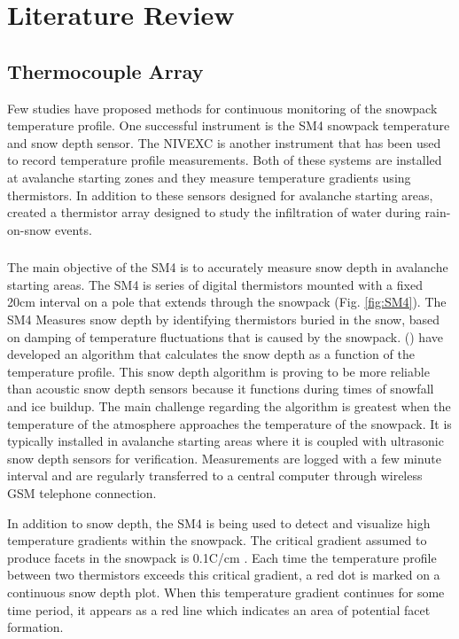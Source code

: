 \chapter{Literature Review}
\section{Thermocouple Array}
Few studies have proposed methods for continuous monitoring of the snowpack temperature profile. One successful instrument is the SM4 snowpack temperature and snow depth sensor. The NIVEXC is another instrument that has been used to record temperature profile measurements. Both of these systems are installed at avalanche starting zones and they measure temperature gradients using thermistors. In addition to these sensors designed for avalanche starting areas, \cite{conway_benedict_1994} created a thermistor array designed to study the infiltration of water during rain-on-snow events. 

\subsection{\cite{ingolfsson2008sm4}}  The main objective of the SM4 is to accurately measure snow depth in avalanche starting areas. The SM4 is series of digital thermistors mounted with a fixed 20cm interval on a pole that extends through the snowpack (Fig. \ref{fig:SM4}). The SM4 Measures snow depth by identifying thermistors buried in the snow, based on damping of temperature fluctuations that is caused by the snowpack. (\cite{ingolfsson2008sm4}) have developed an algorithm that calculates the snow depth as a function of the temperature profile. This snow depth algorithm is proving to be more reliable than acoustic snow depth sensors because it functions during times of snowfall and ice buildup. The main challenge regarding the algorithm is greatest when the temperature of the atmosphere approaches the temperature of the snowpack. It is typically installed in avalanche starting areas where it is coupled with ultrasonic snow depth sensors for verification. Measurements are logged with a few minute interval and are regularly transferred to a central computer through wireless GSM telephone connection.

In addition to snow depth, the SM4 is being used to detect and visualize high temperature gradients within the snowpack. The critical gradient assumed to produce facets in the snowpack is 0.1\textdegree C/cm \cite{mcclung_schaerer_2009}. Each time the temperature profile between two thermistors exceeds this critical gradient, a red dot is marked on a continuous snow depth plot. When this temperature gradient continues for some time period, it appears as a red line which indicates an area of potential facet formation. 

